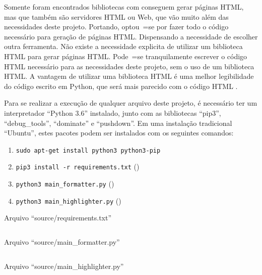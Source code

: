 Somente foram encontrados bibliotecas com  conseguem gerar páginas HTML,
mas que também são servidores HTML ou
Web,
que vão muito além das necessidades deste projeto.
Portando,
optou~=se por fazer todo o código necessário para geração de páginas HTML.
Dispensando a necessidade de escolher outra ferramenta.
Não existe a necessidade explicita de utilizar um biblioteca HTML para gerar páginas HTML.
Pode~=se tranquilamente escrever o código HTML necessário para as necessidades deste projeto,
sem o uso de um biblioteca HTML.
A vantagem de utilizar uma biblioteca HTML é uma melhor legibilidade do código escrito em Python,
que será mais parecido com o código HTML \cite{webDevelopmentWithDjango}.

Para se realizar a execução de qualquer arquivo deste projeto,
é necessário ter um interpretador ``Python 3.6'' instalado,
junto com as bibliotecas ``pip3'',
``debug\_tools'', ``dominate'' e
``pushdown''.
Em uma instalação tradicional ``Ubuntu'',
estes pacotes podem ser instalados com os seguintes comandos:
\begin{enumerate}[1)]
\item \texttt{sudo apt-get install python3 python3-pip}
\item \texttt{pip3 install -r requirements.txt} ()
\item \texttt{python3 main_formatter.py} ()
\item \texttt{python3 main_highlighter.py} ()
\end{enumerate}

\begin{code}
\caption{Arquivo ``source/requirements.txt''}
\label{code:requirementsTxt}
\inputminted{python3}{../source/requirements.txt}
\end{code}

\begin{code}
\caption{Arquivo ``source/main\_formatter.py''}
\label{code:MainFormatterPy}
\inputminted[firstline=39,firstnumber=1]{python3}{../source/main_formatter.py}
\end{code}

\begin{code}
\caption{Arquivo ``source/main\_highlighter.py''}
\label{code:MainHighlighterPy}
\inputminted[firstline=39,firstnumber=1]{python3}{../source/main_highlighter.py}
\end{code}


